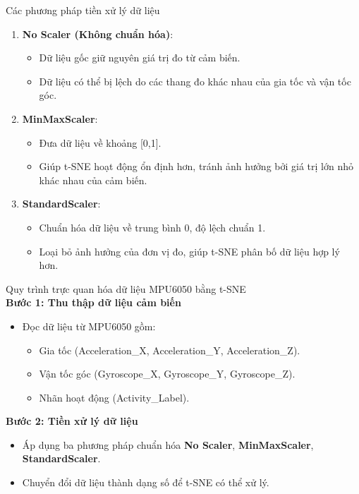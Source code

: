 \documentclass[journal]{IEEEtran}
\begin{document}
Các phương pháp tiền xử lý dữ liệu
\begin{enumerate}
    \item \textbf{No Scaler (Không chuẩn hóa)}: 
    \begin{itemize}
        \item Dữ liệu gốc giữ nguyên giá trị đo từ cảm biến.
        \item Dữ liệu có thể bị lệch do các thang đo khác nhau của gia tốc và vận tốc góc.
    \end{itemize}
    
    \item \textbf{MinMaxScaler}: 
    \begin{itemize}
        \item Đưa dữ liệu về khoảng [0,1].
        \item Giúp t-SNE hoạt động ổn định hơn, tránh ảnh hưởng bởi giá trị lớn nhỏ khác nhau của cảm biến.
    \end{itemize}
    
    \item \textbf{StandardScaler}: 
    \begin{itemize}
        \item Chuẩn hóa dữ liệu về trung bình 0, độ lệch chuẩn 1.
        \item Loại bỏ ảnh hưởng của đơn vị đo, giúp t-SNE phân bố dữ liệu hợp lý hơn.
    \end{itemize}
\end{enumerate}

Quy trình trực quan hóa dữ liệu MPU6050 bằng t-SNE \\
\textbf{Bước 1: Thu thập dữ liệu cảm biến}
\begin{itemize}
    \item Đọc dữ liệu từ MPU6050 gồm:
    \begin{itemize}
        \item Gia tốc (Acceleration\_X, Acceleration\_Y, Acceleration\_Z).
        \item Vận tốc góc (Gyroscope\_X, Gyroscope\_Y, Gyroscope\_Z).
        \item Nhãn hoạt động (Activity\_Label).
    \end{itemize}
\end{itemize}

\textbf{Bước 2: Tiền xử lý dữ liệu}
\begin{itemize}
    \item Áp dụng ba phương pháp chuẩn hóa \textbf{No Scaler}, \textbf{MinMaxScaler}, \textbf{StandardScaler}.
    \item Chuyển đổi dữ liệu thành dạng số để t-SNE có thể xử lý.
\end{itemize}
\end{document}
